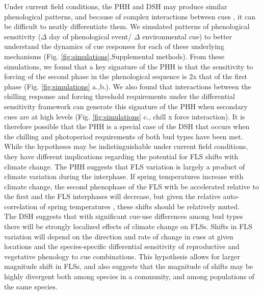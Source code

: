 \documentclass[11pt]{article}
\begin{document}
\noindent Under current field conditions, the PHH and DSH may produce similar phenological patterns, and because of complex interactions between cues \citep{}, it can be difficult to neatly differentiate them. We simulated patterns of phenological sensitivity ($\Delta$ day of phenological event/ $\Delta$ environmental cue) to better understand the dynamics of cue responses for each of these underlying mechanisms (Fig. \ref{fig:simulations},Supplemental methods). From these simulations, we found that a key signature of the PHH is that the sensitivity to forcing of the second phase in the phenological sequence is 2x that of the first phase (Fig. \ref{fig:simulations} a.,b.).  We also found that interactions between the chilling response and forcing threshold requirements under the differential sensitivity framework can generate this signature of the PHH when secondary cues are at high levels (Fig. \ref{fig:simulations} c., chill x force interaction). It is therefore possible that the PHH is a special case of the DSH that occurs when the chilling and photoperiod requirements of both bud types have been met.\\

\noident While the hypotheses may be indistinguishable under current field conditions, they have different implications regarding the potential for FLS shifts with climate change. The PHH suggests that FLS variation is largely a product of climate variation during the interphase. If spring temperatures increase with climate change, the second phenophase of the FLS with be accelerated relative to the first and the FLS interphases will decrease, but given the relative auto-correlation of spring temperatures \citep{Di-Cecco:2018aa}, these shifts should be relatively muted. \\

\noindent The DSH suggests that with significant cue-use differences among bud types there will be strongly localized effects of climate change on FLSs. Shifts in FLS variation will depend on the direction and rate of change in cues at given locations and the species-specific differential sensitivity of reproductive and vegetative phenology to cue combinations. This hypothesis allows for larger magnitude shift in FLSs, and also suggests that the magnitude of shifts may be highly divergent both among species in a community, and among populations of the same species.\\%
\end{document}
